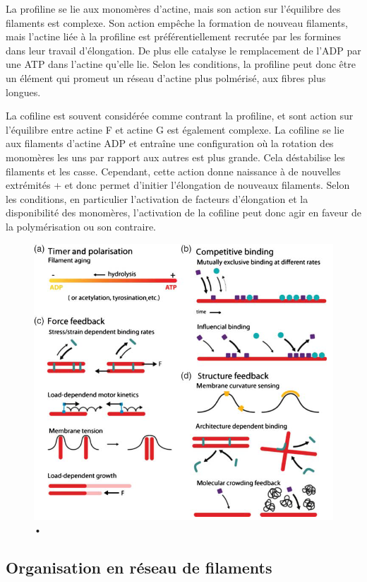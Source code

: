 La profiline se lie aux monomères d'actine, mais son action sur l'équilibre des filaments est complexe. Son action empêche la formation de nouveau filaments, mais l'actine liée à la profiline est préférentiellement recrutée par les formines dans leur travail d'élongation. De plus elle catalyse le remplacement de l'ADP par une ATP dans l'actine qu'elle lie. Selon les conditions, la profiline peut donc être un élément qui promeut un réseau d'actine plus polmérisé, aux fibres plus longues. 

La cofiline est souvent considérée comme contrant la profiline, et sont action sur l'équilibre entre actine F et actine G est également complexe. La cofiline se lie aux filaments d'actine ADP et entraîne une configuration où la rotation des monomères les uns par rapport aux autres est plus grande. Cela déstabilise les filaments et les casse. 
Cependant, cette action donne naissance à de nouvelles extrémités + et donc permet d'initier l'élongation de nouveaux filaments. 
Selon les conditions, en particulier l'activation de facteurs d'élongation et la disponibilité des monomères, l'activation de la cofiline peut donc agir en faveur de la polymérisation ou son contraire. 

\begin{figure}[h!]
\includegraphics[scale=0.7]{Actine_phenomenon.png}
\caption{•}
\end{figure}

\subsection{Organisation en réseau de filaments}

